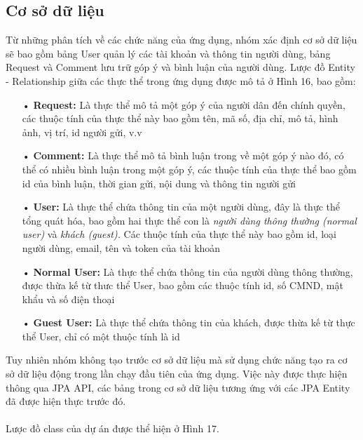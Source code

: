 \documentclass[a4paper]{article}
\begin{document}
\subsection{Cơ sở dữ liệu}
Từ những phân tích về các chức năng của ứng dụng, nhóm xác định cơ sở dữ liệu sẽ bao gồm bảng User quản lý các tài khoản và thông tin người dùng, bảng Request và Comment lưu trữ góp ý và bình luận của người dùng. Lược đồ Entity - Relationship giữa các thực thể trong ứng dụng được mô tả ở Hình 16, bao gồm:
\begin{itemize}
\item[•]\textbf{Request: }Là thực thể mô tả một góp ý của người dân đến chính quyền, các thuộc tính của thực thể này bao gồm tên, mã số, địa chỉ, mô tả, hình ảnh, vị trí, id người gửi, v.v
\item[•]\textbf{Comment: }Là thực thể mô tả bình luận trong về một góp ý nào đó, có thể có nhiều bình luận trong một góp ý, các thuộc tính của thực thể bao gồm id của bình luận, thời gian gửi, nội dung và thông tin người gửi
\item[•]\textbf{User: }Là thực thể chứa thông tin của một người dùng, đây là thực thể tổng quát hóa, bao gồm hai thực thể con là \textit{người dùng thông thường (normal user)} và \textit{khách (guest).} Các thuộc tính của thực thể này bao gồm id, loại người dùng, email, tên và token của tài khoản
\item[•]\textbf{Normal User: }Là thực thể chứa thông tin của người dùng thông thường, được thừa kế từ thưc thể User, bao gồm các thuộc tính id, số CMND, mật khẩu và số điện thoại
\item[•]\textbf{Guest User: }Là thực thể chứa thông tin của khách, được thừa kế từ thực thể User, chỉ có một thuộc tính là id
\end{itemize}
Tuy nhiên nhóm không tạo trước cơ sở dữ liệu mà sử dụng chức năng tạo ra cơ sở dữ liệu động trong lần chạy đầu tiên của ứng dụng. Việc này được thực hiện thông qua JPA API, các bảng trong cơ sở dữ liệu tương ứng với các JPA Entity đã được hiện thực trước đó.\\
\\
Lược đồ class của dự án được thể hiện ở Hình 17.
\end{document}
